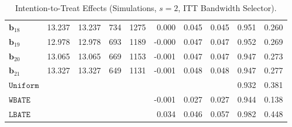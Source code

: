 \documentclass[10pt]{article}
\newcommand{\bb}{\mathbf{b}}
\begin{document}
\begin{table}[p]
\begin{tabular}{lccccrrrrr}
$\bb_{18}$ & 13.237 & 13.237 & 734 & 1275 & 0.000 & 0.045 & 0.045 & 0.951 & 0.260 \\
$\bb_{19}$ & 12.978 & 12.978 & 693 & 1189 & -0.000 & 0.047 & 0.047 & 0.952 & 0.269 \\
$\bb_{20}$ & 13.065 & 13.065 & 669 & 1153 & -0.001 & 0.047 & 0.047 & 0.947 & 0.273 \\
$\bb_{21}$ & 13.327 & 13.327 & 649 & 1131 & -0.001 & 0.048 & 0.048 & 0.947 & 0.277 \\
\midrule
$\mathtt{Uniform}$ &  &  &  &  &  &  &  & 0.932 & 0.381 \\
\midrule
$\mathtt{WBATE}$ &  &  &  &  & -0.001 & 0.027 & 0.027 & 0.944 & 0.138 \\
\midrule
$\mathtt{LBATE}$ &  &  &  &  & 0.034 & 0.046 & 0.057 & 0.982 & 0.448 \\
\bottomrule\bottomrule
\end{tabular}

    \caption{Intention-to-Treat Effects (Simulations, $s=2$, ITT Bandwidth Selector).}
    \label{tab:sa-simuls-itt-s2}
\end{table}
\end{document}
